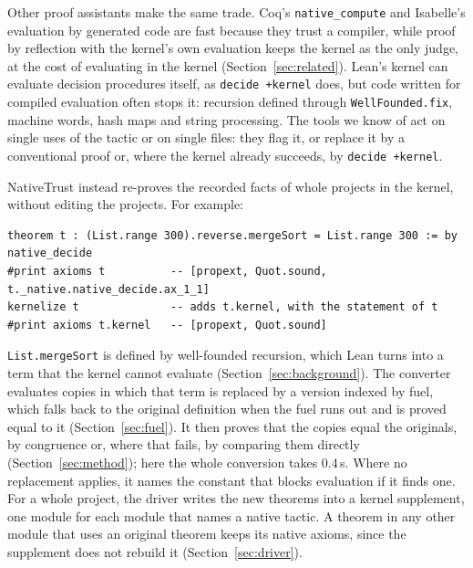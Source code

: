 \documentclass[11pt]{article}
\begin{document}
Other proof assistants make the same trade. Coq's \texttt{native\_compute} and Isabelle's evaluation by
generated code are fast because they trust a compiler, while proof by reflection with the kernel's own evaluation keeps
the kernel as the only judge, at the cost of evaluating in the kernel (Section~\ref{sec:related}). Lean's
kernel can evaluate decision procedures itself, as \texttt{decide +kernel} does, but code written for
compiled evaluation often stops it: recursion defined through \texttt{WellFounded.fix}, machine words, hash
maps and string processing. The tools we know of act on single uses of the tactic or on single files: they flag it, or replace it by a conventional proof
or, where the kernel already succeeds, by \texttt{decide +kernel}.

NativeTrust instead re-proves the recorded facts of whole projects in the kernel, without editing the projects. For
example:

\noindent\begin{minipage}{\linewidth}
\begin{lstlisting}
theorem t : (List.range 300).reverse.mergeSort = List.range 300 := by native_decide
#print axioms t          -- [propext, Quot.sound, t._native.native_decide.ax_1_1]
kernelize t              -- adds t.kernel, with the statement of t
#print axioms t.kernel   -- [propext, Quot.sound]
\end{lstlisting}
\end{minipage}
\texttt{List.mergeSort} is defined by well-founded recursion, which Lean turns into a term that the kernel
cannot evaluate (Section~\ref{sec:background}). The converter evaluates copies in which that term is replaced
by a version indexed by fuel, which falls back to the original definition when the fuel runs out and is proved
equal to it (Section~\ref{sec:fuel}). It then proves that the copies equal the originals, by congruence or,
where that fails, by comparing them directly (Section~\ref{sec:method}); here the whole conversion takes
0.4\,s. Where no replacement applies, it names the constant that
blocks evaluation if it finds one. For a whole project, the driver writes the new theorems into a kernel
supplement, one module for each module that names a native tactic. A theorem in any other module that uses an
original theorem keeps its native axioms, since the supplement does not rebuild it (Section~\ref{sec:driver}).
\end{document}
